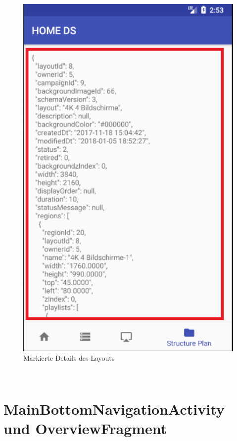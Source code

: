 \\
\begin{figure}[H]
\centering
\includegraphics[width=1.0\textwidth]{images/06_AndroidApp/06_StructureDetail}
\caption{Markierte Details des Layouts}
\label{fig:mediaNav}
\end{figure}
\\
\section{MainBottomNavigationActivity und OverviewFragment}
